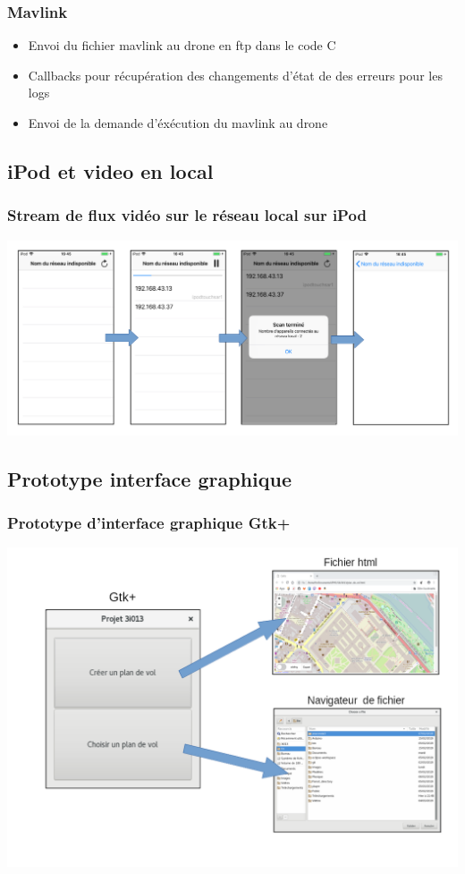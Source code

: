 \documentclass{beamer}
\begin{document}
	\begin{frame}
		\begin{center}
		\frametitle{Mavlink}
           	\begin{itemize}
                \item Envoi du fichier mavlink au drone en ftp dans le code C
                \item Callbacks pour récupération des changements d'état de des erreurs pour les logs
                \item Envoi de la demande d'éxécution du mavlink au drone
            \end{itemize}
		\end{center}
	\end{frame}
	
	\begin{frame}
	\section{iPod et video en local}
		\begin{center}
		\frametitle{Stream de flux vidéo sur le réseau local sur iPod}
		\includegraphics[scale=0.37]{iPod_file_finder.png}
		\end{center}	
	\end{frame}
	
	\begin{frame}
	\section{Prototype interface graphique}
		\begin{center}
		\frametitle{Prototype d'interface graphique Gtk+}		
		\includegraphics[scale=0.35]{schema_GUI.png}
		\end{center}
	\end{frame}
	
\end{document}
